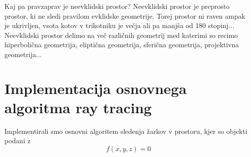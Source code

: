 \documentclass[titlepage]{article}
\begin{document}
Kaj pa pravzaprav je neevklidski prostor?
Neevklidski prostor je preprosto prostor, ki ne sledi pravilom evklidske geometrije. Torej prostor ni raven ampak je ukrivljen, vsota kotov v trikotniku je večja ali pa manjša od 180 stopinj... Neevklidski prostor delimo na več različnih geometrij med katerimi so recimo hiperbolična geometrija, eliptična geometrija, sferična geometrija, projektivna geometrija... 



\section {Implementacija osnovnega algoritma ray tracing}
Implementirali smo osnovni algoritem sledenja žarkov v prostoru, kjer so objekti podani z
\begin{equation}
    f(x,y,z)=0
\end{equation}
\end{document}
